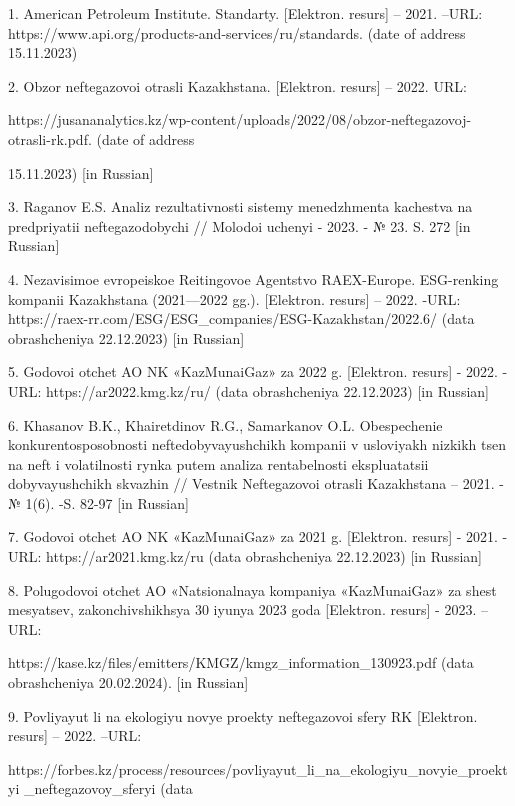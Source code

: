 \begin{noparindent}
1. American Petroleum Institute. Standarty. {[}Elektron. resurs{]} --
2021. --URL: https://www.api.org/products-and-services/ru/standards.
(date of address 15.11.2023)

2. Obzor neftegazovoi otrasli Kazakhstana. {[}Elektron. resurs{]} --
2022. URL:

https://jusananalytics.kz/wp-content/uploads/2022/08/obzor-neftegazovoj-otrasli-rk.pdf.
(date of address

15.11.2023) {[}in Russian{]}

3. Raganov E.S. Analiz rezul\textquotesingle tativnosti sistemy
menedzhmenta kachestva na predpriyatii neftegazodobychi // Molodoi
uchenyi - 2023. - № 23. S. 272 {[}in Russian{]}

4. Nezavisimoe evropeiskoe Reitingovoe Agentstvo RAEX-Europe.
ESG-renking kompanii Kazakhstana (2021---2022 gg.). {[}Elektron.
resurs{]} -- 2022. -URL:
https://raex-rr.com/ESG/ESG\_companies/ESG-Kazakhstan/2022.6/ (data
obrashcheniya 22.12.2023) {[}in Russian{]}

5. Godovoi otchet AO NK «KazMunaiGaz» za 2022 g. {[}Elektron. resurs{]}
- 2022. - URL: https://ar2022.kmg.kz/ru/ (data obrashcheniya 22.12.2023)
{[}in Russian{]}

6. Khasanov B.K., Khairetdinov R.G., Samarkanov O.L. Obespechenie
konkurentosposobnosti neftedobyvayushchikh kompanii v usloviyakh nizkikh
tsen na neft\textquotesingle{} i volatil\textquotesingle nosti rynka
putem analiza rentabel\textquotesingle nosti ekspluatatsii
dobyvayushchikh skvazhin // Vestnik Neftegazovoi otrasli Kazakhstana --
2021. - № 1(6). -S. 82-97 {[}in Russian{]}

7. Godovoi otchet AO NK «KazMunaiGaz» za 2021 g. {[}Elektron. resurs{]}
- 2021. -URL: https://ar2021.kmg.kz/ru (data obrashcheniya 22.12.2023)
{[}in Russian{]}

8. Polugodovoi otchet AO «Natsional\textquotesingle naya kompaniya
«KazMunaiGaz» za shest\textquotesingle{} mesyatsev, zakonchivshikhsya 30
iyunya 2023 goda {[}Elektron. resurs{]} - 2023. --URL:

https://kase.kz/files/emitters/KMGZ/kmgz\_information\_130923.pdf (data
obrashcheniya 20.02.2024). {[}in Russian{]}

9. Povliyayut li na ekologiyu novye proekty neftegazovoi sfery RK
{[}Elektron. resurs{]} -- 2022. --URL:

https://forbes.kz/process/resources/povliyayut\_li\_na\_ekologiyu\_novyie\_proektyi
\_neftegazovoy\_sferyi (data


\end{noparindent}
